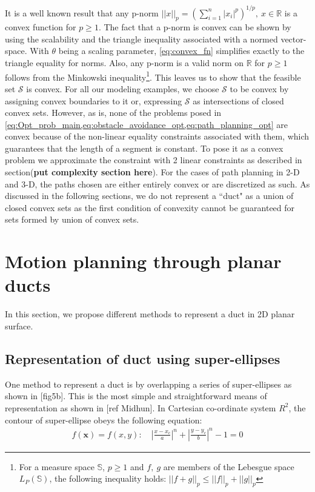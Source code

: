 \documentclass[12pt,a4]{article}
\begin{document}
It is a well known result that any p-norm $||x||_p=(\sum\limits_{i=1}^{n}|x_i|^p)^{1/p},~ x\in \mathbb{R}$ is a convex function for $p\geq 1$. The fact that a p-norm is convex can be shown by using the scalability and the triangle inequality associated with a normed vector-space. With $\theta$  being a scaling parameter, \cref{eq:convex_fn} simplifies exactly to the triangle equality for norms. Also, any p-norm is a valid norm on $\mathbb{R}$ for $p\geq1$ follows from the Minkowski inequality\footnote{For a measure space $\mathbb{S}$, $p\geq 1$ and $f,~g$ are members of the Lebesgue space $L_P(\mathbb{S})$, the following inequality holds: $||f+g||_p\leq ||f||_p+||g||_p$ }. This leaves us to show that the feasible set $\mathcal{S}$ is convex. For all our modeling examples, we choose $\mathcal{S}$ to be convex by assigning convex boundaries to it or, expressing $\mathcal{S}$ as intersections of closed convex sets.  However, as is, none of the problems posed in \cref{eq:Opt_prob_main,eq:obstacle_avoidance_opt,eq:path_planning_opt} are convex because of the non-linear equality constraints associated with them, which guarantees that the length of a segment is constant. To pose it as a convex problem we approximate the constraint with 2 linear constraints as described in section(\textbf{put complexity section here}). For the cases of path planning in 2-D and 3-D, the paths chosen are either entirely convex or are discretized as such. As discussed in the following sections, we do not represent a ``duct" as a union of closed convex sets as the first condition of convexity cannot be guaranteed for sets formed by union of convex sets. 

\section{Motion planning through planar ducts}
%
In this section, we propose different methods to represent a duct in 2D planar surface. 
\subsection{Representation of duct using super-ellipses}
%
One method to represent a duct is by overlapping a series of super-ellipses as shown in [fig5b]. This is the most simple and straightforward means of representation as shown in [ref Midhun]. In Cartesian co-ordinate system $R^2$, the contour of super-ellipse obeys the following equation:
\begin{align}
f(\textbf{x})= f(x,y):\quad \left \vert \frac{x-x_c}{a} \right\vert^n+\left\vert \frac{y-y_c}{b} \right\vert^n-1=0
\end{align}
\end{document}
